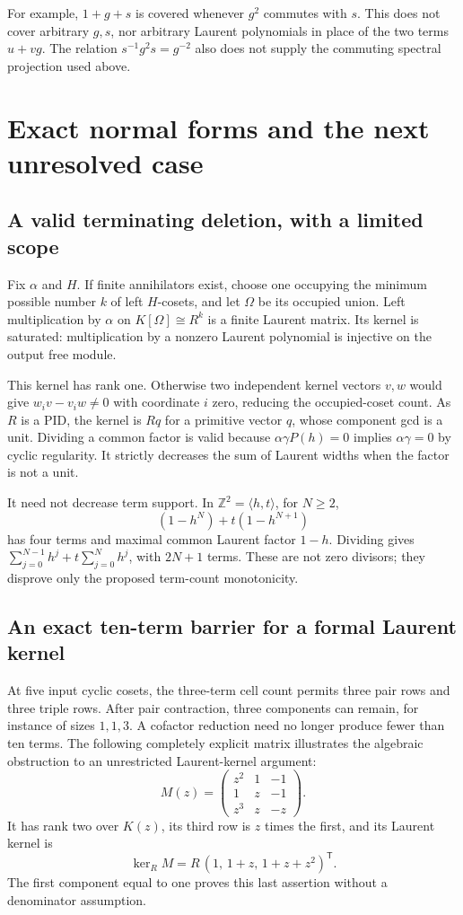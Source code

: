 \documentclass[11pt,a4paper,oneside]{report}
\theoremstyle{definition}
\theoremstyle{remark}
\newcommand{\Z}{\mathbb Z}
\begin{document}
For example, $1+g+s$ is covered whenever $g^2$ commutes with $s$.
This does not cover arbitrary $g,s$, nor arbitrary Laurent
polynomials in place of the two terms $u+vg$. The relation
$s^{-1}g^2s=g^{-2}$ also does not supply the commuting spectral
projection used above.

\section{Exact normal forms and the next unresolved case}\label{M09:sec:gap}
\subsection{A valid terminating deletion, with a limited scope}
Fix $\alpha$ and $H$. If finite annihilators exist, choose one
occupying the minimum possible number $k$ of left $H$-cosets,
and let $\Omega$ be its occupied union. Left multiplication by
$\alpha$ on $K[\Omega]\cong R^k$ is a finite Laurent matrix.
Its kernel is saturated: multiplication by a nonzero Laurent
polynomial is injective on the output free module.

This kernel has rank one. Otherwise two independent kernel
vectors $v,w$ would give $w_iv-v_iw\ne0$ with coordinate $i$
zero, reducing the occupied-coset count. As $R$ is a PID, the
kernel is $Rq$ for a primitive vector $q$, whose component gcd
is a unit. Dividing a common factor is valid because
$\alpha\gamma P(h)=0$ implies $\alpha\gamma=0$ by cyclic
regularity. It strictly decreases the sum of Laurent widths
when the factor is not a unit.

It need not decrease term support. In $\Z^2=\langle h,t\rangle$, for $N\ge2$,
\[
(1-h^N)+t(1-h^{N+1})
\]
has four terms and maximal common Laurent factor $1-h$.
Dividing gives
$\sum_{j=0}^{N-1}h^j+t\sum_{j=0}^{N}h^j$, with $2N+1$ terms.
These are not zero divisors; they disprove only the proposed
term-count monotonicity.

\subsection{An exact ten-term barrier for a formal Laurent kernel}
At five input cyclic cosets, the three-term cell count permits
three pair rows and three triple rows. After pair contraction,
three components can remain, for instance of sizes $1,1,3$.
A cofactor reduction need no longer produce fewer than ten terms.
The following completely explicit matrix illustrates the algebraic
obstruction to an unrestricted Laurent-kernel argument:
\[
M(z)=\begin{pmatrix}
z^2&1&-1\\
1&z&-1\\
z^3&z&-z
\end{pmatrix}.
\]
It has rank two over $K(z)$, its third row is $z$ times the first,
and its Laurent kernel is
\[
\ker_R M=R\,(1,\,1+z,\,1+z+z^2)^{\mathsf T}.
\]
The first component equal to one proves this last assertion
without a denominator assumption.
\end{document}
